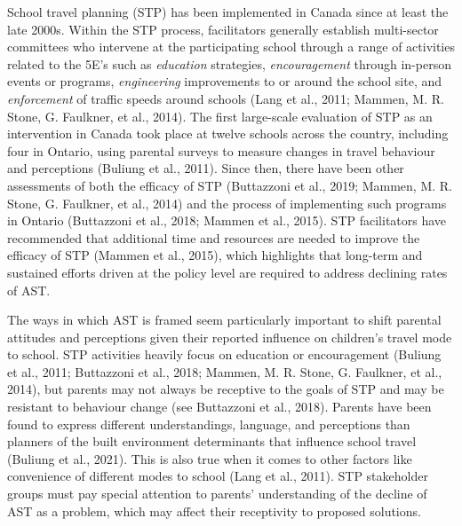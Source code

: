 \documentclass[]{elsarticle} %
\begin{document}
School travel planning (STP) has been implemented in Canada since at
least the late 2000s. Within the STP process, facilitators generally
establish multi-sector committees who intervene at the participating
school through a range of activities related to the 5E's such as
\emph{education} strategies, \emph{encouragement} through in-person
events or programs, \emph{engineering} improvements to or around the
school site, and \emph{enforcement} of traffic speeds around schools
(Lang et al., 2011; Mammen, M. R. Stone, G. Faulkner, et al., 2014). The
first large-scale evaluation of STP as an intervention in Canada took
place at twelve schools across the country, including four in Ontario,
using parental surveys to measure changes in travel behaviour and
perceptions (Buliung et al., 2011). Since then, there have been other
assessments of both the efficacy of STP (Buttazzoni et al., 2019;
Mammen, M. R. Stone, G. Faulkner, et al., 2014) and the process of
implementing such programs in Ontario (Buttazzoni et al., 2018; Mammen
et al., 2015). STP facilitators have recommended that additional time
and resources are needed to improve the efficacy of STP (Mammen et al.,
2015), which highlights that long-term and sustained efforts driven at
the policy level are required to address declining rates of AST.

The ways in which AST is framed seem particularly important to shift
parental attitudes and perceptions given their reported influence on
children's travel mode to school. STP activities heavily focus on
education or encouragement (Buliung et al., 2011; Buttazzoni et al.,
2018; Mammen, M. R. Stone, G. Faulkner, et al., 2014), but parents may
not always be receptive to the goals of STP and may be resistant to
behaviour change (see Buttazzoni et al., 2018). Parents have been found
to express different understandings, language, and perceptions than
planners of the built environment determinants that influence school
travel (Buliung et al., 2021). This is also true when it comes to other
factors like convenience of different modes to school (Lang et al.,
2011). STP stakeholder groups must pay special attention to parents'
understanding of the decline of AST as a problem, which may affect their
receptivity to proposed solutions.
\end{document}
